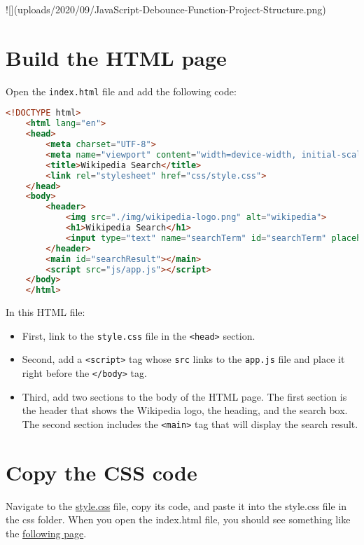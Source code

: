 \documentclass[11pt]{article}
\begin{document}
![](uploads/2020/09/JavaScript-Debounce-Function-Project-Structure.png)

\section*{Build the HTML page}

Open the \verb|index.html| file and add the following code:
\begin{lstlisting}[backgroundcolor = \color{lightgray},
language = HTML,
xleftmargin = 0cm,
framexleftmargin = 0em]
    <!DOCTYPE html>
    <html lang="en">
    <head>
        <meta charset="UTF-8">
        <meta name="viewport" content="width=device-width, initial-scale=1.0">
        <title>Wikipedia Search</title>
        <link rel="stylesheet" href="css/style.css">
    </head>
    <body>
        <header>
            <img src="./img/wikipedia-logo.png" alt="wikipedia">
            <h1>Wikipedia Search</h1>
            <input type="text" name="searchTerm" id="searchTerm" placeholder="Enter a search term...">
        </header>
        <main id="searchResult"></main>
        <script src="js/app.js"></script>
    </body>
    </html>
\end{lstlisting}

In this HTML file:

\begin{itemize}
\item First, link to the \verb|style.css| file in the \verb|<head>| section.
\item Second, add a \verb|<script>| tag whose \verb|src| links to the \verb|app.js| file
and place it right before the \verb|</body>| tag.
\item Third, add two sections to the body of the HTML page.
The first section is the header that shows the Wikipedia logo, the
heading, and the search box. The second section includes the \verb|<main>|
tag that will display the search result.
\end{itemize}

\section*{Copy the CSS code}

Navigate to the \href{https://www.javascripttutorial.net/sample/dom/wikipedia-search/css/style.css}{style.css} file, copy its code, and paste it into the
style.css file in the css folder. When you open the index.html file,
you should see something like the \href{https://www.javascripttutorial.net/sample/dom/wikipedia-search/}{following page}.
\end{document}
